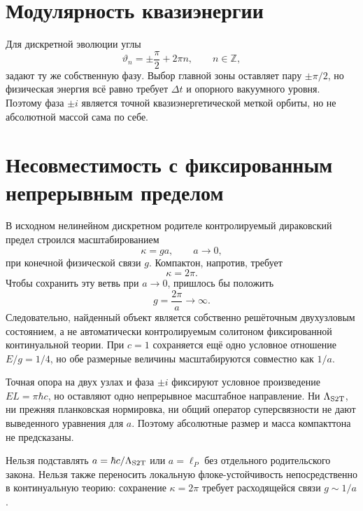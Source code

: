 \section{Модулярность квазиэнергии}

Для дискретной эволюции углы
\begin{equation}
 \vartheta_n=\pm\frac\pi2+2\pi n,
 \qquad n\in\mathbb Z,
\end{equation}
задают ту же собственную фазу. Выбор главной зоны оставляет пару
$\pm\pi/2$, но физическая энергия всё равно требует $\Delta t$ и
опорного вакуумного уровня. Поэтому фаза $\pm i$ является точной
квазиэнергетической меткой орбиты, но не абсолютной массой сама по себе.

\section{Несовместимость с фиксированным непрерывным пределом}

В исходном нелинейном дискретном родителе контролируемый дираковский предел
строился масштабированием
\begin{equation}
 \kappa=ga,
 \qquad a\longrightarrow0,
\end{equation}
при конечной физической связи $g$. Компактон, напротив, требует
\begin{equation}
 \kappa=2\pi.
\end{equation}
Чтобы сохранить эту ветвь при $a\to0$, пришлось бы положить
\begin{equation}
 g=\frac{2\pi}{a}\longrightarrow\infty.
 \label{eq:v6-compacton-divergent-continuum-coupling}
\end{equation}
Следовательно, найденный объект является собственно решёточным
двухузловым состоянием, а не автоматически контролируемым солитоном
фиксированной континуальной теории. При $c=1$ сохраняется ещё одно
условное отношение $E/g=1/4$, но обе размерные величины масштабируются
совместно как $1/a$.

\begin{theorem}
Точная опора на двух узлах и фаза $\pm i$ фиксируют условное произведение
$EL=\pi\hbar c$, но оставляют одно непрерывное масштабное направление.
Ни $\Lambda_{\rm S2T}$, ни прежняя планковская нормировка, ни общий
оператор суперсвязности не дают выведенного уравнения для $a$. Поэтому
абсолютные размер и масса компакттона не предсказаны.
\end{theorem}

\begin{nogocriterion}
Нельзя подставлять $a=\hbar c/\Lambda_{\rm S2T}$ или $a=\ell_P$ без
отдельного родительского закона. Нельзя также переносить локальную
флоке-устойчивость непосредственно в континуальную теорию: сохранение
$\kappa=2\pi$ требует расходящейся связи $g\sim1/a$.
\end{nogocriterion}

